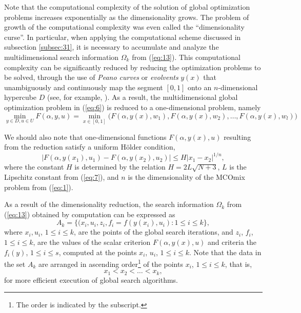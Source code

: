 \documentclass{svproc}
\begin{document}
Note that the computational complexity of the solution of global optimization problems increases exponentially as the dimensionality grows. The problem of growth of the computational complexity was even called the ``dimensionality curse''. In particular, when applying the computational scheme discussed in subsection \ref{subsec:31}, it is necessary to accumulate and analyze the multidimensional search information $\Omega_k$ from (\ref{eq:13}). This computational complexity can be significantly reduced by reducing the optimization problems to be solved, through the use of \textit{Peano curves} or \textit{evolvents} $y(x)$ that unambiguously and continuously map the segment $[0,1]$ onto an $n$-dimensional hypercube $D$ (see, for example, \cite{c24,c25}). As a result, the multidimensional global optimization problem in (\ref{eq:6}) is reduced to a one-dimensional problem, namely
\begin{equation}\label{eq:15}
\min_{y\in D, u \in U}F(\alpha,y,u) = \min_{x \in [0,1]} \bigl(F(\alpha,y(x),w_1 ),F(\alpha,y(x),w_2 ),\dots,F(\alpha,y(x),w_l )\bigr)
\end{equation}

We should also note that one-dimensional functions $F(\alpha,y(x),u)$ resulting from the reduction satisfy a uniform H{\"o}lder condition,
\begin{equation}\label{eq:16}
|F(\alpha, y(x_1),u_1)-F(\alpha, y(x_2),u_2)| \leq H \lvert x_1-x_2\rvert^{1/n},
\end{equation}
where the constant $H$ is determined by the relation $H=2L\sqrt{N+3}$, $L$ is the Lipschitz constant from (\ref{eq:7}), and $n$ is the dimensionality of the MCOmix problem from (\ref{eq:1}).

As a result of the dimensionality reduction, the search information $\Omega_k$ from (\ref{eq:13}) obtained by computation can be expressed as
\begin{equation}\label{eq:17}
A_k=\{(x_i, u_i, z_i, f_i = f(y(x_i), u_i) : 1 \leq i \leq k \},
\end{equation}
where $x_i, u_i$, $1 \leq i \leq k$,  are the points of the global search iterations, and $z_i$, $f_i$, $1 \leq i \leq k$,  are the values of the scalar criterion $F(\alpha,y(x),u)$ and criteria the $f_i (y)$, $1 \leq i \leq s$, computed at the points $x_i$, $u_i$, $1 \leq i \leq k$. Note that the data in the set $A_k$ are arranged in ascending order\footnote{The order is indicated by the subscript.} of the points $x_i$, $1 \leq i \leq k$, that is,
\begin{equation}\label{eq:18}
 x_1< x_2< \dots < x_k,
\end{equation}
for more efficient execution of global search algorithms.
\end{document}
